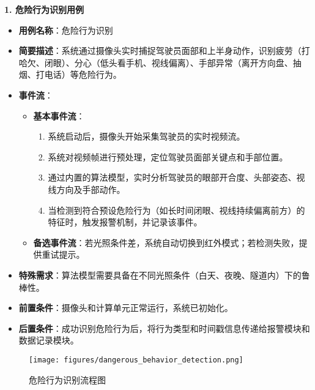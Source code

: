 \documentclass[a4paper,12pt]{article}
\begin{document}
\textbf{1. 危险行为识别用例}
\begin{itemize}
    \item \textbf{用例名称}：危险行为识别
    \item \textbf{简要描述}：系统通过摄像头实时捕捉驾驶员面部和上半身动作，识别疲劳（打哈欠、闭眼）、分心（低头看手机、视线偏离）、手部异常（离开方向盘、抽烟、打电话）等危险行为。
    \item \textbf{事件流}：
    \begin{itemize}
        \item \textbf{基本事件流}：
        \begin{enumerate}
            \item 系统启动后，摄像头开始采集驾驶员的实时视频流。
            \item 系统对视频帧进行预处理，定位驾驶员面部关键点和手部位置。
            \item 通过内置的算法模型，实时分析驾驶员的眼部开合度、头部姿态、视线方向及手部动作。
            \item 当检测到符合预设危险行为（如长时间闭眼、视线持续偏离前方）的特征时，触发报警机制，并记录该事件。
        \end{enumerate}
        \item \textbf{备选事件流}：若光照条件差，系统自动切换到红外模式；若检测失败，提供重试提示。
    \end{itemize}
    \item \textbf{特殊需求}：算法模型需要具备在不同光照条件（白天、夜晚、隧道内）下的鲁棒性。
    \item \textbf{前置条件}：摄像头和计算单元正常运行，系统已初始化。
    \item \textbf{后置条件}：成功识别危险行为后，将行为类型和时间戳信息传递给报警模块和数据记录模块。
\end{itemize}

\begin{figure}[htbp]
    \centering
    \texttt{[image: figures/dangerous\_behavior\_detection.png]}
    \caption{危险行为识别流程图}
    \label{fig:dangerous_behavior_detection}
\end{figure}
\end{document}
